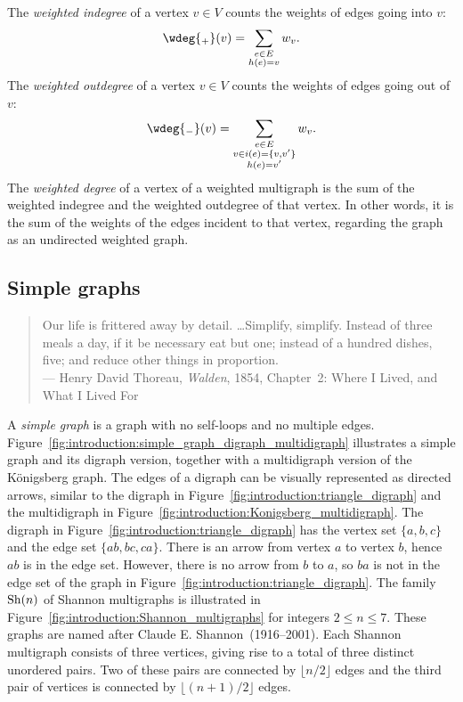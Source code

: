 The \emph{weighted indegree} of a vertex
$v \in V$ counts the weights of edges going into $v$:
\[
\wdeg{_+}(v)
=
\sum_{\substack{e \in E \\ h(e)=v}} w_v.
\]
The \emph{weighted outdegree} of a vertex
$v \in V$ counts the weights of edges going out of $v$:
\[
\wdeg{_-}(v)
=
\sum_{\substack{e \in E \\ v \in i(e)=\{v,v'\} \\ h(e)= v'}} w_v.
\]
The \emph{weighted degree} of a vertex of a
weighted multigraph is the sum of the weighted indegree and the
weighted outdegree of that vertex. In other words, it is the sum of
the weights of the edges incident to that vertex, regarding the graph
as an undirected weighted graph.



\subsection{Simple graphs}

\begin{quote}
\footnotesize
Our life is frittered away by detail. \dots Simplify,
simplify. Instead of three meals a day, if it be necessary eat but
one; instead of a hundred dishes, five; and reduce other things in
proportion. \\
\noindent
--- Henry David Thoreau, \emph{Walden},
1854, Chapter~2: Where I Lived, and What I Lived For
\end{quote}

\noindent
A \emph{simple graph} is a
graph with no self-loops and no multiple edges.
Figure~\ref{fig:introduction:simple_graph_digraph_multidigraph}
illustrates a simple graph and its digraph version, together with a
multidigraph version of the K\"onigsberg graph. The edges of a digraph
can be visually represented as directed arrows, similar to the digraph
in Figure~\ref{fig:introduction:triangle_digraph} and the multidigraph
in Figure~\ref{fig:introduction:Konigsberg_multidigraph}. The digraph
in Figure~\ref{fig:introduction:triangle_digraph} has the vertex set
$\{a, b, c\}$ and the edge set $\{ab, bc, ca\}$. There is an arrow
from vertex $a$ to vertex $b$, hence $ab$ is in the edge set. However,
there is no arrow from $b$ to $a$, so $ba$ is not in the edge set of
the graph in Figure~\ref{fig:introduction:triangle_digraph}. The
family $\operatorname*{Sh}(n)$ of Shannon multigraphs is
illustrated in Figure~\ref{fig:introduction:Shannon_multigraphs} for
integers $2 \leq n \leq 7$. These graphs are named after
Claude E. Shannon~(1916--2001). Each Shannon
multigraph consists of three vertices, giving rise to a total of three
distinct unordered pairs. Two of these pairs are connected by
$\lfloor n/2 \rfloor$ edges and the third pair of vertices is
connected by $\lfloor (n + 1) / 2 \rfloor$ edges.

